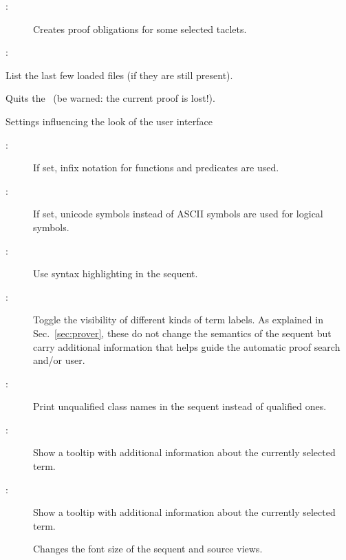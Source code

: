 \begin{description}
\begin{description}
\begin{description}
    \item[:] Creates proof obligations for some selected taclets.

    \item[:]
    \end{description}
    
%   

  \item[\meb{}{Recent Files}:] List the last few loaded files (if
    they are still present).
    
  \item[\meb{}{Exit}:] Quits the \kp\ (be warned: the current
    proof is lost!).
  \end{description}

\item[\mea{View}] Settings influencing the look of the user interface
  \begin{description}
  \item[:] If set, infix notation for functions and predicates are used.
  \item[:] If set, unicode symbols instead of ASCII symbols are used for logical symbols.
  \item[:] Use syntax highlighting in the sequent.
  \item[:] Toggle the visibility of different kinds of term labels. As explained in Sec.~\ref{sec:prover}, these do not change the semantics of the sequent but
  carry additional information that helps guide the automatic proof search and/or user.
  
  \item[:] Print unqualified class names in the sequent instead of qualified ones.
  
  \item[:] Show a tooltip with additional information about the currently selected term.
  \item[:] Show a tooltip with additional information about the currently selected term.

  \item[] Changes the font size of the sequent and source views.


\end{description}
\end{description}
